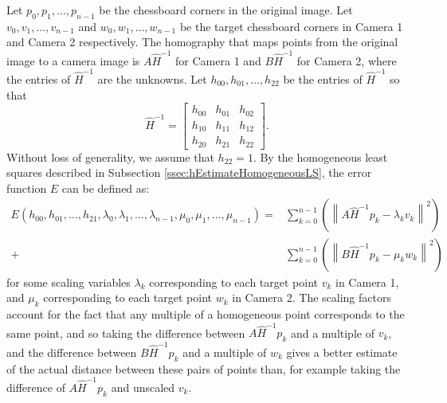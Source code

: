 \documentclass[11pt, oneside, reqno]{book}
\begin{document}
Let $p_0, p_1, \dots, p_{n-1}$ be the chessboard corners in the original image. Let $v_0, v_1, \dots, v_{n-1}$ and $w_0, w_1, \dots, w_{n-1}$ be the target chessboard corners in Camera 1 and Camera 2 respectively. The homography that maps points from the original image to a camera image is $A\widehat{H}^{-1}$ for Camera 1 and $B\widehat{H}^{-1}$ for Camera 2, where the entries of $\widehat{H}^{-1}$ are the unknowns. Let $h_{00}, h_{01}, \dots, h_{22}$ be the entries of $ \widehat{H}^{-1} $ so that
\[
\widehat{H}^{-1} = 
\begin{bmatrix}
h_{00} & h_{01} & h_{02} \\
h_{10} & h_{11} & h_{12} \\
h_{20}& h_{21} & h_{22}
\end{bmatrix}.
\]
Without loss of generality, we assume that $h_{22} = 1$. By the homogeneous least squares described in Subsection \ref{ssec:hEstimateHomogeneousLS}, the error function $E$ can be defined as:
\begin{align*}
E(h_{00}, h_{01}, \dots, h_{21}, \lambda_0, \lambda_1, \dots, \lambda_{n-1}, \mu_0, \mu_1, \dots, \mu_{n-1}) 
= &\sum_{k=0}^{n-1} \left(  \left\| A\widehat{H}^{-1}p_k - \lambda_k v_k\right\|^2 \right)\\
+ &\sum_{k=0}^{n-1} \left( \left\|B\widehat{H}^{-1}p_k - \mu_k w_k\right\|^2 \right)
\end{align*}
for some scaling variables $\lambda_k$ corresponding to each target point $v_k$ in Camera 1, and $\mu_k$ corresponding to each target point $w_k$ in Camera 2. 
The scaling factors account for the fact that any multiple of a homogeneous point corresponds to the same point, and so taking the difference between $A\widehat{H}^{-1}p_k$ and a multiple of $v_k$, and the difference between $B\widehat{H}^{-1}p_k$ and a multiple of $w_k$ gives a better estimate of the actual distance between these pairs of points than, for example taking the difference of $A\widehat{H}^{-1}p_k$ and unscaled $v_k$.
\end{document}

